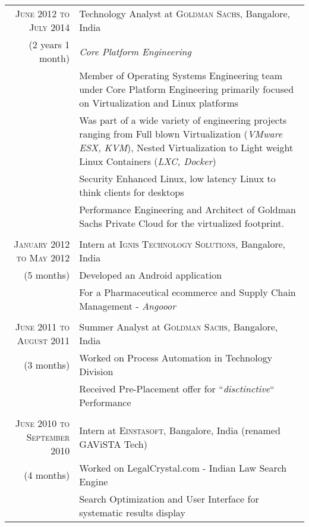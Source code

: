\documentclass[a4paper,10pt]{article} %
\begin{document}
\begin{tabular}{r|p{10cm}}
\textsc{June 2012 to July 2014} & Technology Analyst at \textsc{Goldman Sachs}, Bangalore, India \\
{(2 years 1 month)}& \emph{Core Platform Engineering}\\ 
& \footnotesize{ Member of Operating Systems Engineering team under Core Platform \hbox{Engineering} primarily focused on Virtualization and Linux platforms } \\
& \footnotesize{ Was part of a wide variety of engineering projects ranging from Full blown \hbox{Virtualization} (\textit{VMware ESX, KVM}), Nested Virtualization to Light weight Linux Containers (\textit{LXC, Docker}) } \\
& \footnotesize{ Security Enhanced Linux, low latency Linux to think clients for desktops }\\
& \footnotesize{ Performance Engineering and Architect of Goldman Sachs Private Cloud for the virtualized footprint. }\\
& \\

\textsc{January 2012 to May 2012} & Intern at \textsc{Ignis Technology Solutions}, Bangalore, India \\
{(5 months)}& \footnotesize{ Developed an Android application }\\
& \footnotesize{ For a Pharmaceutical ecommerce and Supply Chain Management - \textit{Angooor} }\\
& \\


\textsc{June 2011 to August 2011} & Summer Analyst at \textsc{Goldman Sachs}, Bangalore, India \\
{(3 months)}& \footnotesize{ Worked on Process Automation in Technology Division }\\
& \footnotesize{ Received Pre-Placement offer for ``\emph{disctinctive}`` Performance }\\
& \\


\textsc{June 2010 to September 2010} & Intern at \textsc{Einstasoft}, Bangalore, India \scriptsize{(renamed GAViSTA Tech)}\\
{(4 months)} & \footnotesize{ Worked on LegalCrystal.com - Indian Law Search Engine }\\
& \footnotesize{ Search Optimization and User Interface for systematic results display }\\


\end{tabular}
\end{document}

